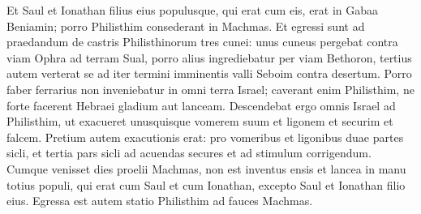 \begin{biblechapter}
\verse Et Saul et Ionathan filius eius populusque, qui erat cum eis, erat in Gabaa Beniamin; porro Philisthim consederant in Machmas. 
\verse Et egressi sunt ad praedandum de castris Philisthinorum tres cunei: unus cuneus pergebat contra viam Ophra ad terram Sual, 
\verse porro alius ingrediebatur per viam Bethoron, tertius autem verterat se ad iter termini imminentis valli Seboim contra desertum. 
\verse Porro faber ferrarius non inveniebatur in omni terra Israel; caverant enim Philisthim, ne forte facerent Hebraei gladium aut lanceam. 
\verse Descendebat ergo omnis Israel ad Philisthim, ut exacueret unusquisque vomerem suum et ligonem et securim et falcem. 
\verse Pretium autem exacutionis erat: pro vomeribus et ligonibus duae partes sicli, et tertia pars sicli ad acuendas secures et ad stimulum corrigendum. 
\verse Cumque venisset dies proelii Machmas, non est inventus ensis et lancea in manu totius populi, qui erat cum Saul et cum Ionathan, excepto Saul et Ionathan filio eius. 
\verse Egressa est autem statio Philisthim ad fauces Machmas. 
\end{biblechapter}

